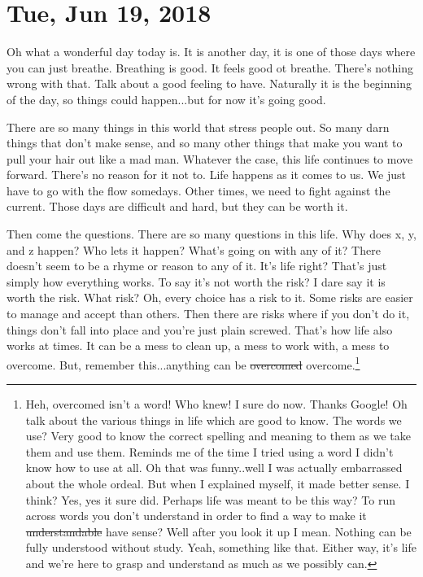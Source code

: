 \section{Tue, Jun 19, 2018}

Oh what a wonderful day today is. It is another day, it is one of those days
where you can just breathe. Breathing is good. It feels good ot breathe. There's
nothing wrong with that. Talk about a good feeling to have. Naturally it is the
beginning of the day, so things could happen...but for now it's going good.

There are so many things in this world that stress people out. So many darn
things that don't make sense, and so many other things that make you want to
pull your hair out like a mad man. Whatever the case, this life continues to
move forward. There's no reason for it not to. Life happens as it comes to us.
We just have to go with the flow somedays. Other times, we need to fight against
the current. Those days are difficult and hard, but they can be worth it.

Then come the questions. There are so many questions in this life. Why does x,
y, and z happen? Who lets it happen? What's going on with any of it? There
doesn't seem to be a rhyme or reason to any of it. It's life right? That's just
simply how everything works. To say it's not worth the risk? I dare say it is
worth the risk. What risk? Oh, every choice has a risk to it. Some risks are
easier to manage and accept than others. Then there are risks where if you don't
do it, things don't fall into place and you're just plain screwed. That's how
life also works at times. It can be a mess to clean up, a mess to work with, a
mess to overcome. But, remember this...anything can be \st{overcomed} 
overcome.\footnote{
Heh, overcomed isn't a word! Who knew! I sure do now. Thanks Google! Oh talk
about the various things in life which are good to know. The words we use? Very
good to know the correct spelling and meaning to them as we take them and use
them. Reminds me of the time I tried using a word I didn't know how to use at
all. Oh that was funny..well I was actually embarrassed about the whole ordeal.
But when I explained myself, it made better sense. I think? Yes, yes it sure
did. Perhaps life was meant to be this way? To run across words you don't
understand in order to find a way to make it \st{understandable} have sense? 
Well after you look it up I mean. Nothing can be fully understood without study. 
Yeah, something like that. Either way, it's life and we're here to grasp and
understand as much as we possibly can.
}

